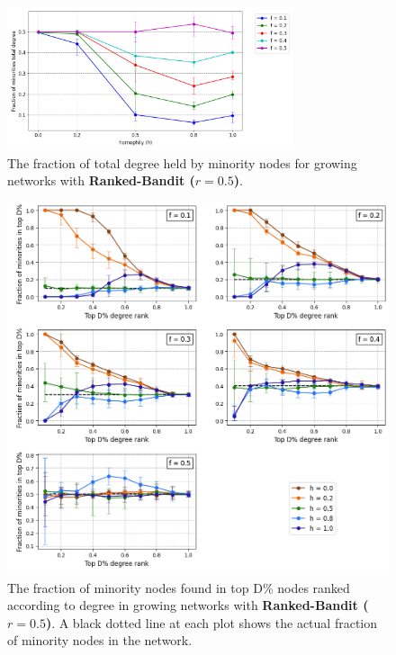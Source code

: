\begin{appendices}
\begin{figure}
	\centering
	\includegraphics[trim=0 5 0 10, clip, width=0.75\textwidth]{images/mf_growth_rb05.png}
	\caption{The fraction of total degree held by minority nodes for growing networks with \textbf{Ranked-Bandit ($r = 0.5$)}.}
	\label{mf_growth_rb05_fig}
\end{figure}

\begin{figure}[h!]
	\centering
	\includegraphics[trim=0 10 0 5, clip, width=1.0\textwidth]{images/top_growth_rb05.png}
	\caption{The fraction of minority nodes found in top D\% nodes ranked according to degree in growing networks with \textbf{Ranked-Bandit ($r = 0.5$)}. A black dotted line at each plot shows the actual fraction of minority nodes in the network.}
	\label{top_growth_rb05_fig}
\end{figure}


\end{appendices}
